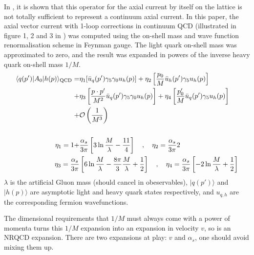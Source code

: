 In \cite{Morningstar:1997ep}, it is shown that this operator for the axial current by itself on the lattice is not totally sufficient to represent a continuum axial current. 
In this paper, the axial vector current with 1-loop corrections in continuum QCD (illustrated in figure 1, 2 and 3 in \cite{Morningstar:1997ep}) was computed using the on-shell mass and wave function renormalisation scheme in Feynman gauge. The light quark on-shell mass was approximated to zero, and the result was expanded in powers of the inverse heavy quark on-shell mass $1/M$.
\begin{align}
	\nonumber
	\langle q(p') | A_0 | h(p) \rangle_{\text{QCD}} = & \eta_1 [ \bar{u}_q(p') \gamma_5\gamma_0 u_h(p) ] + \eta_2 \left[ {p_0\over M} \bar{u}_h(p') \gamma_5 u_h(p) \right] \\
	\nonumber
	+ & \eta_3\left[ {p\cdot p'\over M^2} \bar{u}_q (p') \gamma_5\gamma_0 u_h(p)\right]
	 + \eta_4\left[{p_0'\over M} \bar{u}_q(p') \gamma_5 u_h(p)\right] \\
	 + & \mathcal{O}\left({1\over M^3}\right) \\ \nonumber \\
	 \nonumber
	 \eta_1 =  1 + &{\alpha_s\over 3\pi}\left[ 3\ln {M\over \lambda} - {11\over4} \right] \quad,\quad \eta_2 = {\alpha_s\over 3\pi} 2 \\
	 \nonumber
	 \eta_3 = {\alpha_s\over 3\pi} &\left[ 6\ln {M\over\lambda} - {8\pi\over 3}{M\over\lambda} + {1\over 2} \right] \quad,\quad \eta_4 = {\alpha_s\over 3\pi} \left[ -2 \ln {M\over \lambda} + {1\over 2} \right]
	 \label{eq:continuum_axial}
\end{align}
$\lambda$ is the artificial Gluon mass (should cancel in obeservables), $|q(p')\rangle$ and $|h(p)\rangle$ are asymptotic light and heavy quark states respectively, and $u_{q,h}$ are the corresponding fermion wavefunctions. 

The dimensional requirements that $1/M$ must always come with a power of momenta turns this $1/M$ expansion into an expansion in velocity $v$, so is an NRQCD expansion. There are two expansions at play: $v$ and $\alpha_s$, one should avoid mixing them up.

